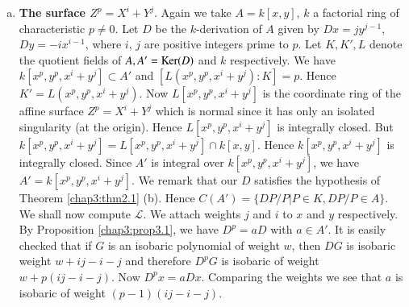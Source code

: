 \begin{enumerate}[(a)]
\item \textbf {The surface {\boldmath$Z^p = X^i + Y^j $}}. Again we
  take $A = k 
  [x, y ]$, $k$ a factorial ring of characteristic $p \neq 0$. Let $D$
  be the $k$-derivation of $A$ given by $Dx = j y^{j - 1}$, $Dy = - i x^{i
    - 1}$, where $i$, $j$ are positive integers prime to $p$. Let $K,
  K', L$ denote the quotient fields of $A, A' = \operatorname{Ker} (D)$ and $k$
  respectively. We have $k[ x^p, y^p, x^i + y^j ] \subset A'$ and $[
    L (x^p, y^p, x^i +  y^j ) : K] = p$. Hence $K' = L (x^p, y^p, x^i
  + y^j)$. Now $L [x^p, y^p, x^i + y^j]$ is the coordinate ring of
  the affine surface $Z^p = X^i + Y^j$ which is normal since it has
  only an isolated singularity (at the origin). Hence $L [ x^p, y^p,
    x^i + y^j]$ is integrally closed. But $k [  x^p, y^p, x^i + y^j] =
  L [ x^p, y^p, x^i + y^j] \cap k [x, y]$. Hence $k [ x^p, y^p, x^i +
    y^j]$ is integrally closed. Since $A'$ is integral over $k [ x^p,
    y^p, x^i + y^j]$, we have $A' = k [ x^p, y^p, x^i + y^j]$. We
  remark that our $D$ satisfies the hypothesis of Theorem \ref{chap3:thm2.1}
  (b). Hence $C(A') = \big\{DP / P \big| P \in K, DP /P \in A \big
  \}$. We shall now compute $\mathscr{L}$. We attach weights $j$ and 
  $i$ to $x$ and $y$ respectively. By Proposition \ref{chap3:prop3.1},
  we have $D^p 
  = a D$ with $a \in A'$. It is easily checked that if $G$ is an
  isobaric polynomial of weight $w$, then $DG$ is isobaric weight
  $w+ij - i - j$ and therefore $D^p G$ is isobaric of weight $w + p(ij
  - i - j)$. Now $D^p x = aDx$. Comparing the weights we see that $a$ is
  isobaric of weight $(p -1) (ij - i - j)$. 
    \end{enumerate}    
    
